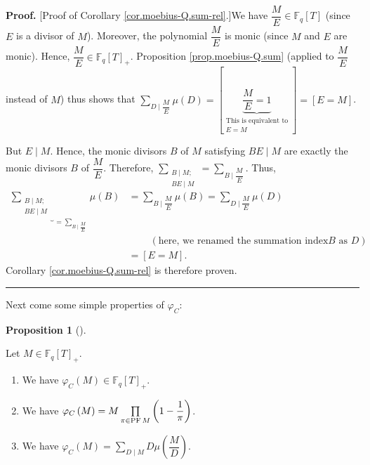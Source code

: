 \documentclass[numbers=enddot,12pt,final,onecolumn,notitlepage]{scrartcl}%
\theoremstyle{definition}
\newtheorem{prop}[theo]{Proposition}
\newenvironment{proposition}[1][]
{\begin{prop}[#1]\begin{leftbar}}
{\end{leftbar}\end{prop}}
\newenvironment{proof}[1][Proof]{\noindent\textbf{#1.} }{\ \rule{0.5em}{0.5em}}
\let\sumnonlimits\sum
\let\prodnonlimits\prod
\renewcommand{\sum}{\sumnonlimits\limits}
\renewcommand{\prod}{\prodnonlimits\limits}
\begin{document}
\begin{proof}
[Proof of Corollary \ref{cor.moebius-Q.sum-rel}.]We have $\dfrac{M}{E}%
\in\mathbb{F}_{q}\left[  T\right]  $ (since $E$ is a divisor of $M$).
Moreover, the polynomial $\dfrac{M}{E}$ is monic (since $M$ and $E$ are
monic). Hence, $\dfrac{M}{E}\in\mathbb{F}_{q}\left[  T\right]  _{+}$.
Proposition \ref{prop.moebius-Q.sum} (applied to $\dfrac{M}{E}$ instead of
$M$) thus shows that $\sum_{D\mid\dfrac{M}{E}}\mu\left(  D\right)  =\left[
\underbrace{\dfrac{M}{E}=1}_{\substack{\text{This is equivalent to}%
\\E=M}}\right]  =\left[  E=M\right]  $.

But $E\mid M$. Hence, the monic divisors $B$ of $M$ satisfying $BE\mid M$ are
exactly the monic divisors $B$ of $\dfrac{M}{E}$. Therefore, $\sum
_{\substack{B\mid M;\\BE\mid M}}=\sum_{B\mid\dfrac{M}{E}}$. Thus,%
\begin{align*}
\underbrace{\sum_{\substack{B\mid M;\\BE\mid M}}}_{=\sum_{B\mid\dfrac{M}{E}}%
}\mu\left(  B\right)   &  =\sum_{B\mid\dfrac{M}{E}}\mu\left(  B\right)
=\sum_{D\mid\dfrac{M}{E}}\mu\left(  D\right) \\
&  \ \ \ \ \ \ \ \ \ \ \left(  \text{here, we renamed the summation index
}B\text{ as }D\right) \\
&  =\left[  E=M\right]  .
\end{align*}
Corollary \ref{cor.moebius-Q.sum-rel} is therefore proven.
\end{proof}

Next come some simple properties of $\varphi_{C}$:

\begin{proposition}
\label{prop.phiC-Q.formula}Let $M\in\mathbb{F}_{q}\left[  T\right]  _{+}$.

\begin{enumerate}
\item[\textbf{(a)}] We have $\varphi_{C}\left(  M\right)  \in\mathbb{F}%
_{q}\left[  T\right]  _{+}$.

\item[\textbf{(b)}] We have $\varphi_{C}\left(  M\right)  =M\prod
\limits_{\pi\in\operatorname*{PF}M}\left(  1-\dfrac{1}{\pi}\right)  $.

\item[\textbf{(c)}] We have $\varphi_{C}\left(  M\right)  =\sum_{D\mid M}%
D\mu\left(  \dfrac{M}{D}\right)  $.
\end{enumerate}
\end{proposition}
\end{document}
